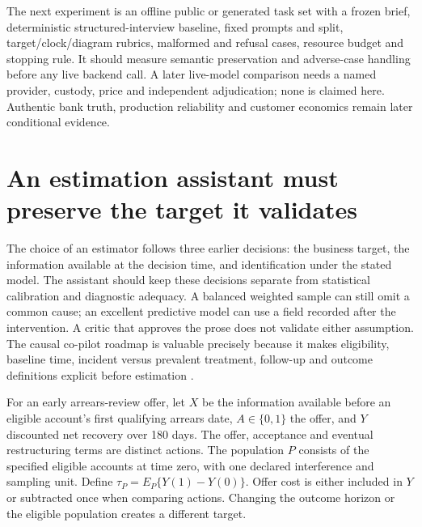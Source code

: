The next experiment is an offline public or generated task set with a frozen brief, deterministic structured-interview baseline, fixed prompts and split, target/clock/diagram rubrics, malformed and refusal cases, resource budget and stopping rule. It should measure semantic preservation and adverse-case handling before any live backend call. A later live-model comparison needs a named provider, custody, price and independent adjudication; none is claimed here. Authentic bank truth, production reliability and customer economics remain later conditional evidence.


\section{An estimation assistant must preserve the target it validates}
\label{exec14:estimation-validation}

The choice of an estimator follows three earlier decisions: the business target,
the information available at the decision time, and identification under the
stated model. The assistant should keep these decisions separate from statistical
calibration and diagnostic adequacy. A balanced weighted sample can still omit
a common cause; an excellent predictive model can use a field recorded after
the intervention. A critic that approves the prose does not validate either
assumption. The causal co-pilot roadmap is valuable precisely because it makes
eligibility, baseline time, incident versus prevalent treatment, follow-up and
outcome definitions explicit before estimation \citep{v12_la_2407_19118}.

For an early arrears-review offer, let $X$ be the information available before
an eligible account's first qualifying arrears date, $A\in\{0,1\}$ the offer,
and $Y$ discounted net recovery over 180 days. The offer, acceptance and eventual
restructuring terms are distinct actions. The population $P$ consists of the
specified eligible accounts at time zero, with one declared interference and
sampling unit. Define $\tau_P=E_P\{Y(1)-Y(0)\}$. Offer cost is either included
in $Y$ or subtracted once when comparing actions. Changing the outcome horizon
or the eligible population creates a different target.


